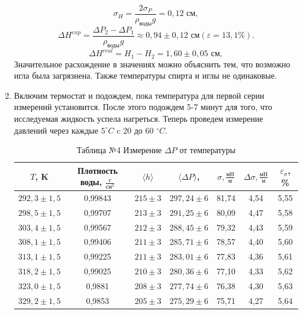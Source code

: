 \documentclass[a4paper]{article}
\begin{document}
\begin{enumerate}
\begin{equation*}
	\sigma_{H} = \frac{2\sigma_{P}}{\rho_{\text{воды}}g} = 0,12\text{ см},
\end{equation*}
\begin{equation*}
	\Delta H^{exp} = \frac{\Delta P_2 - \Delta P_1}{\rho_{\text{воды}}g} \approx 0,94 \pm 0,12 \text{ см}(\varepsilon = 13,1 \%).
\end{equation*}
\begin{equation*}
	\Delta H^{real} = H_1 - H_2 = 1,60 \pm 0,05 \text{ см},
\end{equation*}
Значительное расхождение в значениях можно объяснить тем, что возможно игла была загрязнена. Также температуры спирта и иглы не одинаковые. 

\item Включим термостат и подождем, пока температура для первой серии измерений установится. После этого подождем 5-7 минут для того, что исследуемая жидкость успела нагреться. Теперь проведем измерение давлений через каждые $5 ^\circ C$ c 20 до 60 $^\circ C$.
\begin{table}[h!] 
	\caption{Таблица №4 Измерение $\Delta P$ от температуры }
	\begin{center}
		\begin{tabular}{|*{7}{c|}}
			\hline
			 $T$, K & Плотность воды\footnotemark[1], $\frac{\text{г}}{\text{см}^2}$&$\langle h\rangle$ & $\langle \Delta P\rangle$, \text{Па} & $\sigma, \frac{\text{мН}}{\text{м}}$ & $\Delta \sigma, \frac{\text{мН}}{\text{м}}$ & $\varepsilon_{\sigma}$, \% \\ \hline
			$292,3\pm 1,5$& 0,99843 &	$215\pm 3$&	$297,24\pm6$&	81,74&	4,54&	5,55\\ \hline
			$298,5\pm 1,5$& 0,99707 &	$213\pm 3$&	$291,25\pm6$&	80,09&	4,47&	5,58\\ \hline
			$303,4\pm 1,5$& 0,99567 &	$212\pm 3$&	$288,45\pm6$&	79,32&	4,43&	5,59\\ \hline
			$308,1\pm 1,5$&0,99406  &	$211\pm 3$&	$285,71\pm6$&	78,57&	4,40&	5,60\\ \hline
			$313,1\pm 1,5$& 0,99225 &	$211\pm 3$&	$283,01\pm6$&	77,83&	4,36&	5,61\\ \hline
			$318,2\pm 1,5$& 0,99025 &	$210\pm 3$&	$280,36\pm6$&	77,10&	4,33&	5,62\\ \hline
			$323,0\pm 1,5$   & 0,9881   &	$208\pm 3$&	$277,74\pm6$&	76,38&	4,30&	5,63\\ \hline
			$329,2\pm 1,5$& 0,9853   &	$205\pm 3$&	$275,29\pm6$&	75,71&	4,27&	5,64\\ \hline

\end{tabular}
\end{center}
\end{table}
\end{enumerate}
\end{document}
